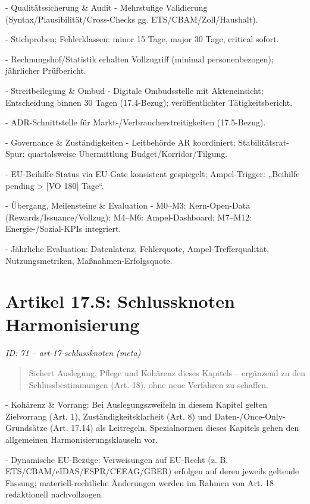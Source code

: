 \documentclass[12pt,a4paper]{scrartcl}
\begin{document}
- Qualitätssicherung \& Audit
- Mehrstufige Validierung (Syntax/Plausibilität/Cross-Checks gg. ETS/CBAM/Zoll/Haushalt).

- Stichproben; Fehlerklassen: minor 15 Tage, major 30 Tage, critical sofort.

- Rechnungshof/Statistik erhalten Vollzugriff (minimal personenbezogen); jährlicher Prüfbericht.

- Streitbeilegung \& Ombud
- Digitale Ombudsstelle mit Akteneinsicht; Entscheidung binnen 30 Tagen (17.4-Bezug); veröffentlichter Tätigkeitsbericht.

- ADR-Schnittstelle für Markt-/Verbraucherstreitigkeiten (17.5-Bezug).

- Governance \& Zuständigkeiten
- Leitbehörde AR koordiniert; Stabilitätsrat-Spur: quartalsweise Übermittlung Budget/Korridor/Tilgung.

- EU-Beihilfe-Status via EU-Gate konsistent gespiegelt; Ampel-Trigger: „Beihilfe pending > [VO 180] Tage“.

- Übergang, Meilensteine \& Evaluation
- M0--M3: Kern-Open-Data (Rewards/Issuance/Vollzug); M4--M6: Ampel-Dashboard; M7--M12: Energie-/Sozial-KPIs integriert.

- Jährliche Evaluation: Datenlatenz, Fehlerquote, Ampel-Trefferqualität, Nutzungsmetriken, Maßnahmen-Erfolgsquote.


\section[Artikel 17.S: Schlussknoten Harmonisierung]{Artikel 17.S: Schlussknoten Harmonisierung}
\noindent\textit{ID: 71 -- art-17-schlussknoten (meta)}

\begin{quote}
Sichert Auslegung, Pflege und Kohärenz dieses Kapitels -- ergänzend zu den Schlussbestimmungen (Art. 18), ohne neue Verfahren zu schaffen.
\end{quote}

- Kohärenz \& Vorrang: Bei Auslegungszweifeln in diesem Kapitel gelten Zielvorrang (Art. 1), Zuständigkeitsklarheit (Art. 8) und Daten-/Once-Only-Grundsätze (Art. 17.14) als Leitregeln. Spezialnormen dieses Kapitels gehen den allgemeinen Harmonisierungsklauseln vor.

- Dynamische EU-Bezüge: Verweisungen auf EU-Recht (z. B. ETS/CBAM/eIDAS/ESPR/CEEAG/GBER) erfolgen auf deren jeweils geltende Fassung; materiell-rechtliche Änderungen werden im Rahmen von Art. 18 redaktionell nachvollzogen.
\end{document}
